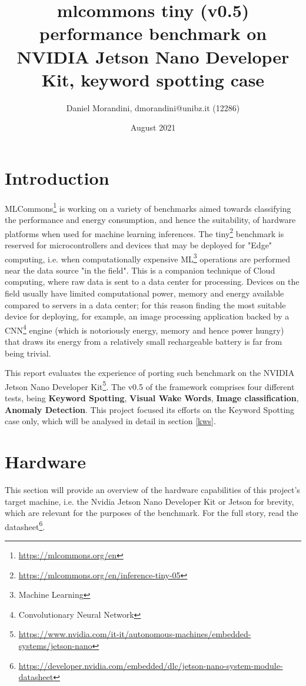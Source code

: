 \documentclass{article}
\title{mlcommons tiny (v0.5) performance benchmark on NVIDIA Jetson Nano Developer Kit, keyword spotting case}
\author{Daniel Morandini, dmorandini@unibz.it (12286)}
\date{August 2021}
\begin{document}
\maketitle

\section{Introduction}
MLCommons\footnote{\url{https://mlcommons.org/en}} is working on a variety of benchmarks aimed towards classifying the performance and energy consumption, and hence the suitability, of hardware platforms when used for machine learning inferences. The tiny\footnote{\url{https://mlcommons.org/en/inference-tiny-05}} benchmark is reserved for microcontrollers and devices that may be deployed for "Edge" computing, i.e. when computationally expensive ML\footnote{Machine Learning} operations are performed near the data source "in the field". This is a companion technique of Cloud computing, where raw data is sent to a data center for processing. Devices on the field usually have limited computational power, memory and energy available compared to servers in a data center; for this reason finding the most suitable device for deploying, for example, an image processing application backed by a CNN\footnote{Convolutionary Neural Network} engine (which is notoriously energy, memory and hence power hungry) that draws its energy from a relatively small rechargeable battery is far from being trivial.

This report evaluates the experience of porting such benchmark on the NVIDIA Jetson Nano Developer Kit\footnote{\url{https://www.nvidia.com/it-it/autonomous-machines/embedded-systems/jetson-nano}}. The v0.5 of the framework comprises four different tests, being \textbf{Keyword Spotting}, \textbf{Visual Wake Words}, \textbf{Image classification}, \textbf{Anomaly Detection}. This project focused its efforts on the Keyword Spotting case only, which will be analysed in detail in section \ref{kws}.

\section{Hardware}\label{hw}
This section will provide an overview of the hardware capabilities of this project's target machine, i.e. the Nvidia Jetson Nano Developer Kit or Jetson for brevity, which are relevant for the purposes of the benchmark. For the full story, read the datasheet\footnote{\url{https://developer.nvidia.com/embedded/dlc/jetson-nano-system-module-datasheet}}.
\end{document}

